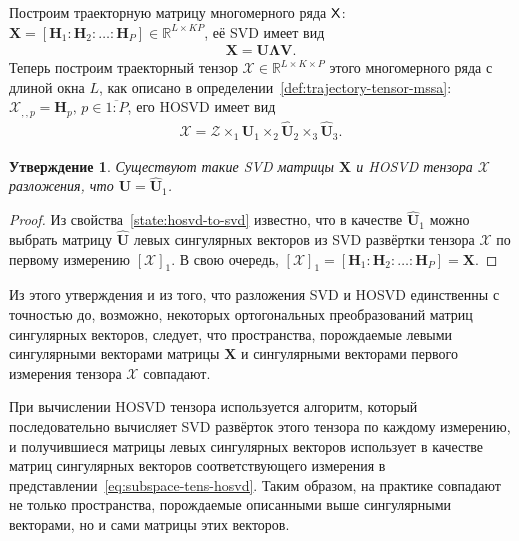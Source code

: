 \documentclass[specialist,
    substylefile = spbu_report.rtx,
    subf,href,colorlinks=true, 12pt]{disser}
\theoremstyle{plain}
\newtheorem{statement}{Утверждение}[section]
\theoremstyle{definition}
\theoremstyle{remark}
\begin{document}
    Построим траекторную матрицу многомерного ряда $\mathsf{X}$:
    $\mathbf{X} = [\mathbf{H}_1: \mathbf{H}_2: \ldots: \mathbf{H}_P] \in \mathbb{R}^{L\times KP}$,
    её SVD имеет вид
    \begin{gather*}
        \mathbf{X} =\mathbf{U} \mathbf{\Lambda} \mathbf{V}.
    \end{gather*}
    Теперь построим траекторный тензор $\mathcal{X}\in \mathbb{R}^{L\times K \times P}$ этого многомерного ряда
    с длиной окна $L$, как описано в определении~\ref{def:trajectory-tensor-mssa}:
    $\mathcal{X}_{,,p} = \mathbf{H}_p,\, p\in \overline{1:P}$,
    его HOSVD имеет вид
    \begin{gather}
        \mathcal{X}=\mathcal{Z} \times_1 \hat{\mathbf{U}}_1 \times_2 \hat{\mathbf{U}}_2 \times_3 \hat{\mathbf{U}}_3.
        \label{eq:subspace-tens-hosvd}
    \end{gather}

    \begin{statement}
        Существуют такие \emph{SVD} матрицы $\mathbf{X}$ и \emph{HOSVD} тензора $\mathcal{X}$ разложения, что
        $\mathbf{U} = \hat{\mathbf{U}}_1$.\label{state:tens-mssa-rank}
    \end{statement}

    \begin{proof}
        Из свойства~\ref{state:hosvd-to-svd} известно, что в качестве $\hat{\mathbf{U}}_1$ можно выбрать матрицу
        $\hat{\mathbf{U}}$ левых сингулярных векторов из SVD развёртки тензора $\mathcal{X}$ по первому измерению $[\mathcal{X}]_{1}$.
        В свою очередь, $[\mathcal{X}]_{1} = [\mathbf{H}_1: \mathbf{H}_2: \ldots: \mathbf{H}_P] = \mathbf{X}$.
    \end{proof}

    Из этого утверждения и из того, что разложения SVD и HOSVD единственны с точностью
    до, возможно, некоторых ортогональных преобразований матриц сингулярных векторов,
    следует, что пространства, порождаемые левыми сингулярными векторами матрицы $\mathbf{X}$
    и сингулярными векторами первого измерения тензора $\mathcal{X}$ совпадают.

    При вычислении HOSVD тензора используется алгоритм, который последовательно вычисляет SVD развёрток этого тензора
    по каждому измерению, и получившиеся матрицы левых сингулярных векторов использует в качестве матриц сингулярных
    векторов соответствующего измерения в представлении~\eqref{eq:subspace-tens-hosvd}.
    Таким образом, на практике совпадают не только пространства, порождаемые описанными выше сингулярными векторами,
    но и сами матрицы этих векторов.
\end{document}

